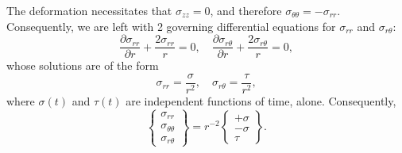 The deformation necessitates that $\sigma_{zz} = 0$, and therefore $\sigma_{\theta \theta} = - \sigma_{rr}$. Consequently, we are left with 2 governing differential equations for $\sigma_{rr}$ and $\sigma_{r \theta}$:
\begin{equation}
  \frac{\partial \sigma_{rr}}{\partial r} + \frac{2 \sigma_{rr}}{r} = 0, \quad \frac{\partial \sigma_{r\theta}}{\partial r} + \frac{2 \sigma_{r\theta}}{r} = 0,
\end{equation}
whose solutions are of the form
\begin{equation}
  \sigma_{rr} = \frac{\sigma}{r^2}, \quad \sigma_{r\theta} = \frac{\tau}{r^2},
\end{equation}
where $\sigma(t)$ and $\tau(t)$ are independent functions of time, alone. Consequently,
\begin{equation}
  \left\{ \begin{array}{c} \sigma_{rr} \\ \sigma_{\theta \theta} \\ \sigma_{r \theta} \end{array} \right\} = r^{-2} \left\{ \begin{array}{c} +\sigma \\ -\sigma \\ \tau \end{array} \right\}.
\end{equation}

